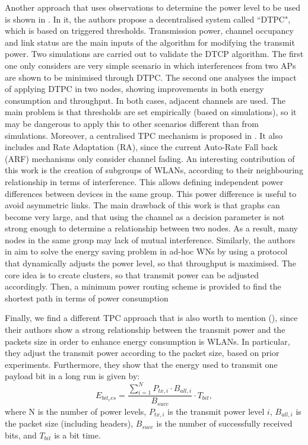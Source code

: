 \documentclass[12pt, a4paper,twoside]{tesi_upf}
\begin{document}
				Another approach that uses observations to determine the power level to be used is shown in \cite{gandarillas2014dynamic}. In it, the authors propose a decentralised system called ``DTPC", which is based on triggered thresholds. Transmission power, channel occupancy and link status are the main inputs of the algorithm for modifying the transmit power. Two simulations are carried out to validate the DTCP algorithm. The first one only considers are very simple scenario in which interferences from two APs are shown to be minimised through DTPC. The second one analyses the impact of applying DTPC in two nodes, showing improvements in both energy consumption and throughput. In both cases, adjacent channels are used. The main problem is that thresholds are set empirically (based on simulations), so it may be dangerous to apply this to other scenarios different than from simulations.	Moreover, a centralised TPC mechanism is proposed in \cite{tang2014joint}. It also includes and Rate Adaptation (RA), since the current Auto-Rate Fall back (ARF) mechanisms only consider channel fading. An interesting contribution of this work is the creation of subgroups of WLANs, according to their neighbouring relationship in terms of interference. This allows defining independent power differences between devices in the same group. This power difference is useful to avoid asymmetric links. The main drawback of this work is that graphs can become very large, and that using the channel as a decision parameter is not strong enough to determine a relationship between two nodes. As a result, many nodes in the same group may lack of mutual interference. Similarly, the authors in \cite{elbatt2000power} aim to solve the energy saving problem in ad-hoc WNs by using a protocol that dynamically adjusts the power level, so that throughput is maximised. The core idea is to create clusters, so that transmit power can be adjusted accordingly. Then, a minimum power routing scheme is provided to find the shortest path in terms of power consumption
				
				Finally, we find a different TPC approach that is also worth to mention (\cite{ebert2000energy}), since their authors show a strong relationship between the transmit power and the packets size in order to enhance energy consumption is WLANs. In particular, they adjust the transmit power according to the packet size, based on prior experiments. Furthermore, they show that the energy used to transmit one payload bit in a long run is given by:
				\begin{equation}
				E_{bit_res} = \frac{\sum_{i=1}^N P_{tx,i} \cdot B_{all,i}}{B_{succ}} \cdot T_{bit},
				\nonumber
				\end{equation}
				where N is the number of power levels, $P_{tx,i}$ is the transmit power level $i$, $B_{all,i}$ is the packet size (including headers), $B_{succ}$ is the number of successfully received bits, and $T_{bit}$ is a bit time. 
				
\end{document}
